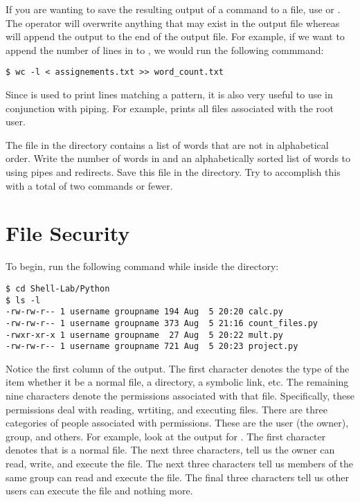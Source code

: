 If you are wanting to save the resulting output of a command to a file, use \li{>} or \li{>>}. The \li{>} operator will overwrite anything that may exist in the output file whereas \li{>>} will append the output to the end of the output file. For example, if we want to append the number of lines in  to , we would run the following commmand:

\begin{lstlisting}
$ wc -l < assignements.txt >> word_count.txt
\end{lstlisting}

Since  is used to print lines matching a pattern, it is also very useful to use in conjunction with piping. For example,  prints all files associated with the root user.

\begin{problem}
The  file in the  directory contains a list of words that are not in alphabetical order. Write the number of words in  and an alphabetically sorted list of words to  using pipes and redirects. Save this file in the  directory. Try to accomplish this with a total of two commands or fewer.
\end{problem}

\section*{File Security}
To begin, run the following command while inside the  directory:

\begin{lstlisting}
$ cd Shell-Lab/Python
$ ls -l 
-rw-rw-r-- 1 username groupname 194 Aug  5 20:20 calc.py
-rw-rw-r-- 1 username groupname 373 Aug  5 21:16 count_files.py
-rwxr-xr-x 1 username groupname  27 Aug  5 20:22 mult.py
-rw-rw-r-- 1 username groupname 721 Aug  5 20:23 project.py

\end{lstlisting}

Notice the first column of the output. The first character denotes the type of the item whether it be a normal file, a directory, a symbolic link, etc. The remaining nine characters denote the permissions associated with that file. Specifically, these permissions deal with reading, wrtiting, and executing files. There are three categories of people associated with permissions. These are the user (the owner), group, and others. For example, look at the output for . The first character \li{-} denotes that  is a normal file. The next three characters,  tell us the owner can read, write, and execute the file. The next three characters  tell us members of the same group can read and execute the file. The final three characters  tell us other users can execute the file and nothing more.

